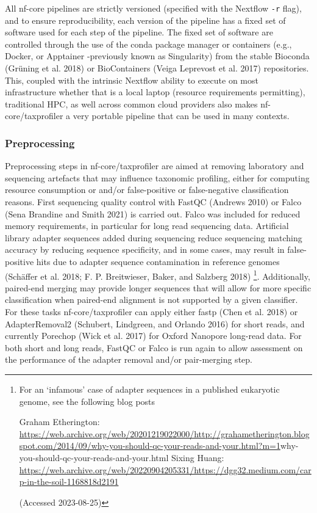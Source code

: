 \documentclass[
]{article}
\begin{document}
All nf-core pipelines are strictly versioned (specified with the
Nextflow \texttt{-r} flag), and to ensure reproducibility, each version
of the pipeline has a fixed set of software used for each step of the
pipeline. The fixed set of software are controlled through the use of
the conda package manager or containers (e.g., Docker, or Apptainer
-previously known as Singularity) from the stable Bioconda (Grüning et
al. 2018) or BioContainers (Veiga Leprevost et al. 2017) repositories.
This, coupled with the intrinsic Nextflow ability to execute on most
infrastructure whether that is a local laptop (resource requirements
permitting), traditional HPC, as well across common cloud providers also
makes nf-core/taxprofiler a very portable pipeline that can be used in
many contexts.

\hypertarget{preprocessing}{%
\subsubsection{Preprocessing}\label{preprocessing}}

Preprocessing steps in nf-core/taxprofiler are aimed at removing
laboratory and sequencing artefacts that may influence taxonomic
profiling, either for computing resource consumption or and/or
false-positive or false-negative classification reasons. First
sequencing quality control with FastQC (Andrews 2010) or Falco (Sena
Brandine and Smith 2021) is carried out. Falco was included for reduced
memory requirements, in particular for long read sequencing data.
Artificial library adapter sequences added during sequencing reduce
sequencing matching accuracy by reducing sequence specificity, and in
some cases, may result in false-positive hits due to adapter sequence
contamination in reference genomes (Schäffer et al. 2018; F. P.
Breitwieser, Baker, and Salzberg 2018) \footnote{For an `infamous' case
  of adapter sequences in a published eukaryotic genome, see the
  following blog posts

  Graham Etherington:
  \url{https://web.archive.org/web/20201219022000/http://grahametherington.blogspot.com/2014/09/why-you-should-qc-your-reads-and-your.html?m=1}why-you-should-qc-your-reads-and-your.html
  Sixing Huang:
  \url{https://web.archive.org/web/20220904205331/https://dgg32.medium.com/carp-in-the-soil-1168818d2191}

  (Accessed 2023-08-25)}. Additionally, paired-end merging may provide
longer sequences that will allow for more specific classification when
paired-end alignment is not supported by a given classifier. For these
tasks nf-core/taxprofiler can apply either fastp (Chen et al. 2018) or
AdapterRemoval2 (Schubert, Lindgreen, and Orlando 2016) for short reads,
and currently Porechop (Wick et al. 2017) for Oxford Nanopore long-read
data. For both short and long reads, FastQC or Falco is run again to
allow assessment on the performance of the adapter removal and/or
pair-merging step.
\end{document}
